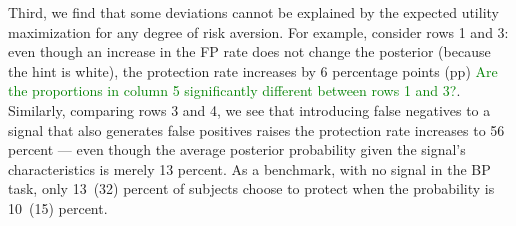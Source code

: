 \documentclass[12pt,a4paper]{article}
\begin{document}
Third, we find that some deviations cannot be explained by the expected utility maximization for any degree of risk aversion. For example, consider rows 1 and 3: even though an increase in the FP rate does not change the posterior (because the hint is white), the protection rate increases by 6 percentage points (pp) \textcolor{green}{Are the proportions in column 5 significantly different between rows 1 and 3?}. Similarly, comparing rows 3 and 4, we see that introducing false negatives to a signal that also generates false positives raises the protection rate increases to 56 percent --- even though the average posterior probability given the signal's characteristics is merely 13 percent. As a benchmark, with no signal in the BP task, only 13~(32) percent of subjects choose to protect when the probability is 10~(15) percent. 


\begin{table}[H]\centering 
\caption{Average Protection by Signal Type} 
\label{tab:nonparIP}
\end{table}
\end{document}
